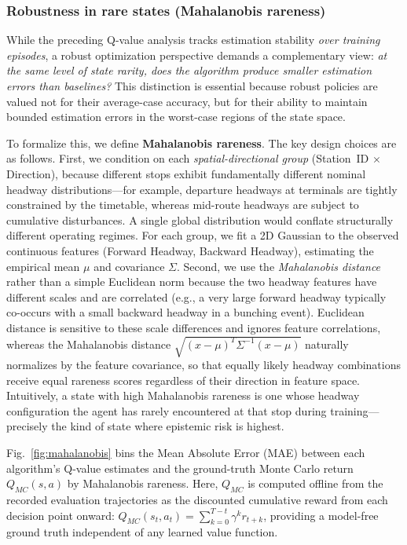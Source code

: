 \documentclass[10pt]{article}
\begin{document}
\subsubsection{Robustness in rare states (Mahalanobis rareness)}
While the preceding Q-value analysis tracks estimation stability \emph{over training episodes}, a robust optimization perspective demands a complementary view: \emph{at the same level of state rarity, does the algorithm produce smaller estimation errors than baselines?} This distinction is essential because robust policies are valued not for their average-case accuracy, but for their ability to maintain bounded estimation errors in the worst-case regions of the state space.

To formalize this, we define \textbf{Mahalanobis rareness}. The key design choices are as follows. First, we condition on each \emph{spatial-directional group} (Station~ID $\times$ Direction), because different stops exhibit fundamentally different nominal headway distributions---for example, departure headways at terminals are tightly constrained by the timetable, whereas mid-route headways are subject to cumulative disturbances. A single global distribution would conflate structurally different operating regimes. For each group, we fit a 2D Gaussian to the observed continuous features (Forward Headway, Backward Headway), estimating the empirical mean $\mu$ and covariance $\Sigma$. Second, we use the \emph{Mahalanobis distance} rather than a simple Euclidean norm because the two headway features have different scales and are correlated (e.g., a very large forward headway typically co-occurs with a small backward headway in a bunching event). Euclidean distance is sensitive to these scale differences and ignores feature correlations, whereas the Mahalanobis distance $\sqrt{(x-\mu)^T\Sigma^{-1}(x-\mu)}$ naturally normalizes by the feature covariance, so that equally likely headway combinations receive equal rareness scores regardless of their direction in feature space. Intuitively, a state with high Mahalanobis rareness is one whose headway configuration the agent has rarely encountered at that stop during training---precisely the kind of state where epistemic risk is highest.

Fig.~\ref{fig:mahalanobis} bins the Mean Absolute Error (MAE) between each algorithm's Q-value estimates and the ground-truth Monte Carlo return $Q_{MC}(s,a)$ by Mahalanobis rareness. Here, $Q_{MC}$ is computed offline from the recorded evaluation trajectories as the discounted cumulative reward from each decision point onward: $Q_{MC}(s_t, a_t) = \sum_{k=0}^{T-t} \gamma^k r_{t+k}$, providing a model-free ground truth independent of any learned value function.
\end{document}
